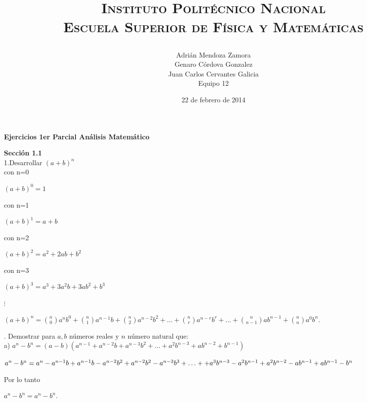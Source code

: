 \documentclass[12pt,a4paper,scrartcl]{article}
\title{	
\date{22 de febrero de 2014}
\normalfont \normalsize 
\textsc{Instituto Polit\'ecnico Nacional\\
Escuela Superior de F\'isica y Matem\'aticas} \\
}
\author{Adri\'an Mendoza Zamora\\
Genaro C\'ordova Gonzalez\\
Juan Carlos Cervantes Galicia\\
Equipo 12}
\begin{document}
\maketitle

{\textbf{{Ejercicios 1er Parcial  An\'alisis Matem\'atico }}

\textbf{Secci\'on 1.1}\\

1.Desarrollar $(a+b)^n$\\

con n=0\\
\begin{center}
$(a+b)^0=1$
\end{center}

con n=1\\
\begin{center}
$(a+b)^1=a+b$
\end{center}

con n=2\\
\begin{center}
$(a+b)^2=a^2+2ab+b^2$
\end{center}

con n=3\\
\begin{center}
$(a+b)^3=a^3+3a^2b+3ab^2+b^3$
\end{center}

\begin{center}
$\vdots$
\end{center}

\begin{center}
$(a+b)^n=\binom{n}{0}a^nb^0+\binom{n}{1}a^{n-1}b+\binom{n}{2}a^{n-2}b^2+\dots+\binom{n}{r}a^{n-r}b^r+\dots+\binom{n}{n-1}ab^{n-1}+\binom{n}{n}a^0b^n$.
\end{center}





. Demostrar para $a,b$ n\'umeros reales y $n$ n\'umero natural que:\\

a) 
$a^n-b^n = (a-b)(a^{n-1}+a^{n-2}b+a^{n-3}b^2+ \hdots +a^{2}b^{n-3}+ab^{n-2}+b^{n-1}) $\\
\begin{center}
$a^n-b^n=a^n-a^{n-1}b+a^{n-1}b-a^{n-2}b^2+a^{n-2}b^2-a^{n-3}b^3+\ldots+\linebreak+a^3b^{n-3}-a^{2}b^{n-1}+a^2b^{n-2}-ab^{n-1}+ab^{n-1}-b^n$
\end{center}
Por lo tanto \\
\begin{center}
$a^n-b^n=a^n-b^n$.
\end{center}
\vspace{5em}

}
\end{document}
